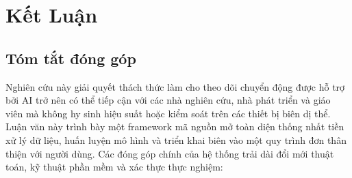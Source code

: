 \chapter{Kết Luận}
\label{chap:conclusion}

\section{Tóm tắt đóng góp}

Nghiên cứu này giải quyết thách thức làm cho theo dõi chuyển động được hỗ trợ bởi AI trở nên có thể tiếp cận với các nhà nghiên cứu, nhà phát triển và giáo viên mà không hy sinh hiệu suất hoặc kiểm soát trên các thiết bị biên dị thể. Luận văn này trình bày một framework mã nguồn mở toàn diện thống nhất tiền xử lý dữ liệu, huấn luyện mô hình và triển khai biên vào một quy trình đơn thân thiện với người dùng. Các đóng góp chính của hệ thống trải dài đổi mới thuật toán, kỹ thuật phần mềm và xác thực thực nghiệm:

